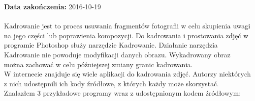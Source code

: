 \noindent\textbf{Data zakończenia:} 2016-10-19\\
\\

 Kadrowanie jest to proces usuwania fragmentów fotografii w celu skupienia uwagi na jego części lub poprawienia kompozycji. Do kadrowania i prostowania zdjęć w programie Photoshop służy narzędzie Kadrowanie. Działanie narzędzia Kadrowanie nie powoduje modyfikacji danych obrazu. Wykadrowany obraz można zachować w celu późniejszej zmiany granic kadrowania.\\

W internecie znajduje się wiele aplikacji do kadrowania zdjęć. Autorzy niektórych z nich udostępnili ich kody źródłowe, z których każdy może skorzystać.\\

Znalazłem 3 przykładowe programy wraz z udostępnionym kodem źródłowym:


